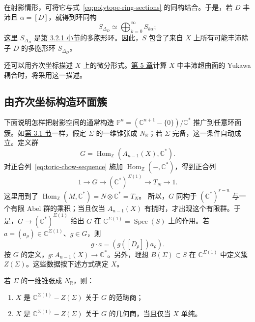 在射影情形，可将它与式~\eqref{eq:polytope-ring-sections} 的同构结合。于是，若 $D$ 丰沛且 $\alpha=[D]$，就得到环同构
\[
S_{\Delta_D}\simeq\bigoplus_{k=0}^{\infty}S_{k\alpha};
\]
这里 $S_{\Delta_D}$ 是\hyperref[subsec:toric-from-polytopes]{第 3.2.1 小节}的多胞形环。因此，$S$ 包含了来自 $X$ 上所有可能丰沛除子 $D$ 的多胞形环 $S_{\Delta_D}$。

还可以用齐次坐标描述 $X$ 上的微分形式。\hyperref[chap:hodge-yukawa]{第 5 章}计算 $X$ 中丰沛超曲面的 Yukawa 耦合时，将采用这一描述。

\subsection{由齐次坐标构造环面簇}\label{subsec:toric-from-homogeneous}

下面说明怎样把射影空间的通常构造
$\mathbb P^n=(\mathbb C^{n+1}-\{0\})/\mathbb C^*$
推广到任意环面簇。如\hyperref[sec:cones-fans]{第 3.1 节}一样，假定 $\Sigma$ 的一维锥张成 $N_{\mathbb R}$；若 $\Sigma$ 完备，这一条件自动成立。定义群
\[
G=\operatorname{Hom}_{\mathbb Z}(A_{n-1}(X),\mathbb C^*).
\]
对正合列~\eqref{eq:toric-chow-sequence} 施加 $\operatorname{Hom}_{\mathbb Z}(-,\mathbb C^*)$，得到正合列
\begin{equation}\label{eq:toric-g-sequence}
1\longrightarrow G\longrightarrow(\mathbb C^*)^{\Sigma(1)}
\longrightarrow T_N\longrightarrow1.
\end{equation}
这里用到了
$\operatorname{Hom}_{\mathbb Z}(M,\mathbb C^*)
=N\otimes\mathbb C^*=T_N$。
所以，$G$ 同构于 $(\mathbb C^*)^{r-n}$ 与一个有限 Abel 群的乘积；当且仅当 $A_{n-1}(X)$ 有挠时，才出现这个有限群。于是，$G\to(\mathbb C^*)^{\Sigma(1)}$ 给出 $G$ 在 $\mathbb C^{\Sigma(1)}=\operatorname{Spec}(S)$ 上的作用。若 $a=(a_\rho)\in\mathbb C^{\Sigma(1)}$、$g\in G$，则
\[
g\cdot a=(g([D_\rho])a_\rho).
\]
按 $G$ 的定义，$g:A_{n-1}(X)\to\mathbb C^*$。另外，理想 $B(\Sigma)\subset S$ 在 $\mathbb C^{\Sigma(1)}$ 中定义簇 $Z(\Sigma)$。这些数据按下述方式确定 $X$。

\begin{theorem}\label{thm:toric-quotient}
若 $\Sigma$ 的一维锥张成 $N_{\mathbb R}$，则：
\begin{enumerate}[label=(\roman*)]
\item $X$ 是 $\mathbb C^{\Sigma(1)}-Z(\Sigma)$ 关于 $G$ 的范畴商；
\item $X$ 是 $\mathbb C^{\Sigma(1)}-Z(\Sigma)$ 关于 $G$ 的几何商，当且仅当 $X$ 单纯。
\end{enumerate}
\end{theorem}

